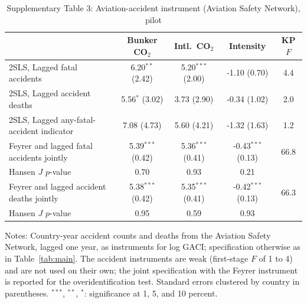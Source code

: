 \documentclass[12pt]{article}
\begin{document}
\begin{table}[htbp]
\centering
\begin{threeparttable}
\caption{Supplementary Table 3: Aviation-accident instrument (Aviation Safety Network), pilot}
\label{tab:accident_iv}
\footnotesize
\begin{tabular}{lcccc}
\toprule
 & Bunker CO$_2$ & Intl.\ CO$_2$ & Intensity & KP $F$ \\
\midrule
  2SLS, Lagged fatal accidents & 6.20$^{**}$ (2.42) & 5.20$^{***}$ (2.00) & -1.10 (0.70) & 4.4 \\
  2SLS, Lagged accident deaths & 5.56$^{*}$ (3.02) & 3.73 (2.90) & -0.34 (1.02) & 2.0 \\
  2SLS, Lagged any-fatal-accident indicator & 7.08 (4.73) & 5.60 (4.21) & -1.32 (1.63) & 1.2 \\
  Feyrer and lagged fatal accidents jointly & 5.39$^{***}$ (0.42) & 5.36$^{***}$ (0.41) & -0.43$^{***}$ (0.13) & 66.8 \\
  \quad Hansen $J$ $p$-value & 0.70 & 0.93 & 0.21 & \\
  Feyrer and lagged accident deaths jointly & 5.38$^{***}$ (0.42) & 5.35$^{***}$ (0.41) & -0.42$^{***}$ (0.13) & 66.3 \\
  \quad Hansen $J$ $p$-value & 0.95 & 0.59 & 0.93 & \\
\bottomrule
\end{tabular}
\begin{tablenotes}[flushleft]
\footnotesize
\item Notes: Country-year accident counts and deaths from the Aviation Safety Network, lagged one year, as instruments for log GACI; specification otherwise as in Table~\ref{tab:main}. The accident instruments are weak (first-stage $F$ of 1 to 4) and are not used on their own; the joint specification with the Feyrer instrument is reported for the overidentification test. Standard errors clustered by country in parentheses. $^{***}$, $^{**}$, $^{*}$: significance at 1, 5, and 10 percent.
\end{tablenotes}
\end{threeparttable}
\end{table}
\end{document}
